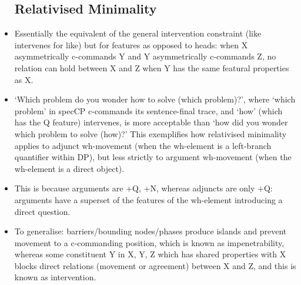 \documentclass{article}
\begin{document}
\begin{itemize}
    \subsection{Relativised Minimality}
    \item Essentially the equivalent of the general intervention constraint (like intervenes for like) but for features as opposed to heads: when X asymmetrically c-commands Y and Y asymmetrically c-commands Z, no relation can hold between X and Z when Y has the same featural properties as X.
    \item `Which problem do you wonder how to solve (which problem)?', where `which problem' in specCP c-commands its sentence-final trace, and `how' (which has the Q feature) intervenes, is more acceptable than `how did you wonder which problem to solve (how)?' This exemplifies how relativised minimality applies to adjunct wh-movement (when the wh-element is a left-branch quantifier within DP), but less strictly to argument wh-movement (when the wh-element is a direct object).
    \item This is because arguments are +Q, +N, whereas adjuncts are only +Q: arguments have a superset of the features of the wh-element introducing a direct question.
    \item To generalise: barriers/bounding nodes/phases produce islands and prevent movement to a c-commanding position, which is known as impenetrability, whereas some constituent Y in X, Y, Z which has shared properties with X blocks direct relations (movement or agreement) between X and Z, and this is known as intervention.
\end{itemize}
\end{document}
